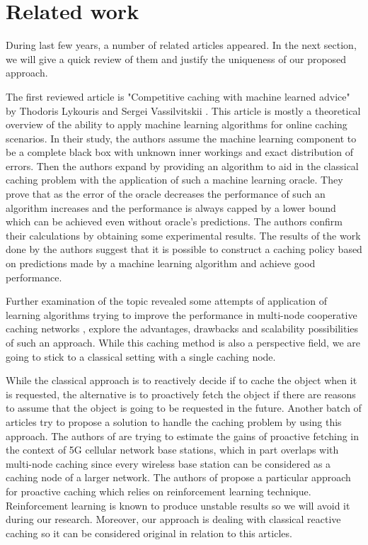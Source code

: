 \section{Related work} \label{related_work}

During last few years, a number of related articles appeared. In the next section, we will give a quick review of them and justify the uniqueness of our proposed approach.

The first reviewed article is "Competitive caching with machine learned advice" by Thodoris Lykouris and Sergei Vassilvitskii \cite{18}. This article is mostly a theoretical overview of the ability to apply machine learning algorithms for online caching scenarios. In their study, the authors assume the machine learning component to be a complete black box with unknown inner workings and exact distribution of errors. Then the authors expand by providing an algorithm to aid in the classical caching problem with the application of such a machine learning oracle. They prove that as the error of the oracle decreases the performance of such an algorithm increases and the performance is always capped by a lower bound which can be achieved even without oracle's predictions. The authors confirm their calculations by obtaining some experimental results. The results of the work done by the authors suggest that it is possible to construct a caching policy based on predictions made by a machine learning algorithm and achieve good performance.

Further examination of the topic revealed some attempts of application of learning algorithms trying to improve the performance in multi-node cooperative caching networks \cite{19}, explore the advantages, drawbacks and scalability possibilities of such an approach. While this caching method is also a perspective field, we are going to stick to a classical setting with a single caching node.

While the classical approach is to reactively decide if to cache the object when it is requested, the alternative is to proactively fetch the object if there are reasons to assume that the object is going to be requested in the future. Another batch of articles \cite{20, 21} try to propose a solution to handle the caching problem by using this approach. The authors of \cite{20} are trying to estimate the gains of proactive fetching in the context of 5G cellular network base stations, which in part overlaps with multi-node caching since every wireless base station can be considered as a caching node of a larger network. The authors of \cite{21} propose a particular approach for proactive caching which relies on reinforcement learning technique. Reinforcement learning is known to produce unstable results so we will avoid it during our research. Moreover, our approach is dealing with classical reactive caching so it can be considered original in relation to this articles.

